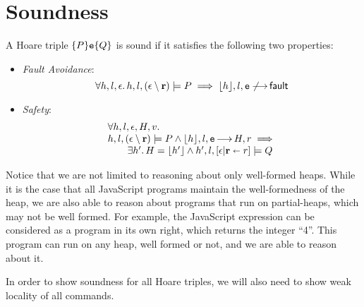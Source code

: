 \documentclass{article}
\begin{document}








\section{Soundness}
\label{sec:soundness}

\begin{defn}
        \label{defn:soundness}
A Hoare triple $\{P\}\mbox{\texttt{{\upshape e}}}\{Q\}$ is sound if it satisfies the following two properties:

\begin{itemize}
                \item \emph{Fault Avoidance}:
                        \[
                        \forall h,l,\epsilon\mathpunct{.}
                        h,l,(\epsilon\setminus{\ensuremath{\mathrm{\textbf{r}}}}) \models P \implies \lfloor h\rfloor,l,\mbox{\texttt{{\upshape e}}} \not\!\!\!{\,\longrightarrow\,} {\mathsf{fault}}
                        \]
                \item \emph{Safety}: 
                        \[
                        \begin{array}{l}
                                \forall h,l,\epsilon,H,v\mathpunct{.}\\
                                h,l,(\epsilon\setminus{\ensuremath{\mathrm{\textbf{r}}}}) \models P \land \lfloor h\rfloor,l,\mbox{\texttt{{\upshape e}}} {\,\longrightarrow\,} H,r \implies \\
                                \qquad\exists h' \mathpunct{.} H=\lfloor h'\rfloor \land h',l,[\epsilon|{\mathrm{\textbf{r}}}\shortleftarrow r] \models Q
                        \end{array}
                        \]
\end{itemize}
\end{defn}
Notice that we are not limited to reasoning about only well-formed heaps. While
it is the case that all JavaScript programs maintain the well-formedness of the
heap, we are also able to reason about programs that run on partial-heaps,
which may not be well formed. For example, the JavaScript expression  can be
considered as a program in its own right, which returns the integer ``4''. This
program can run on any heap, well formed or not, and we are able to reason
about it.

In order to show soundness for all Hoare triples, we will also need to show weak locality of all commands.
\end{document}
